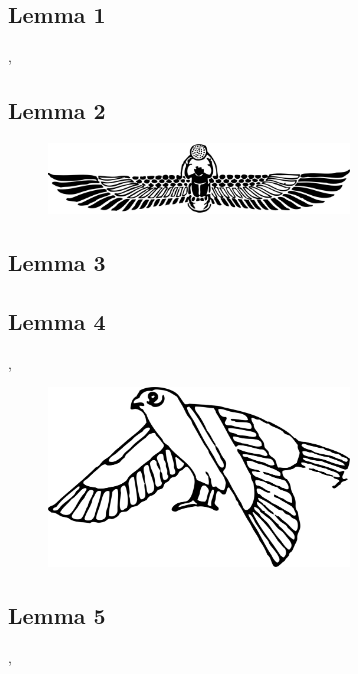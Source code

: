 \documentclass[preview]{standalone}
\begin{document}
\subsection{\color{section}Lemma 1}

\vspace{2\baselineskip}
\sep
\pagebreak


\subsection{\color{section}Lemma 2}

\begin{figure}[!h]
    \centering
    \includegraphics[width=8cm]{../resources/jpg/2.2.set.operations/scarab.png}
\end{figure}


\subsection{\color{section}Lemma 3}

\pagebreak


\subsection{\color{section}Lemma 4}

\sep
\vspace{1.5\baselineskip}
\begin{figure}[!h]
    \centering
    \includegraphics[width=8cm]{../resources/jpg/2.2.set.operations/bird.png}
\end{figure}
\pagebreak



\subsection{\color{section}Lemma 5}

\sep
\pagebreak
\end{document}

